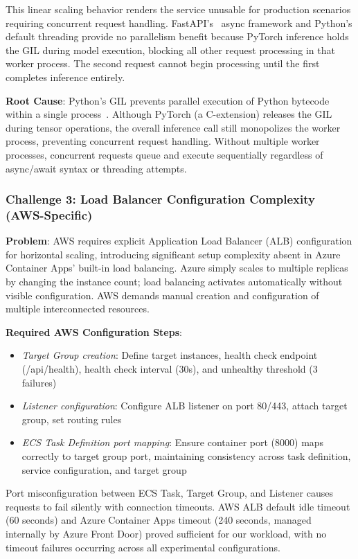 This linear scaling behavior renders the service unusable for production scenarios requiring concurrent request handling. FastAPI's~\cite{fastapi2024} async framework and Python's default threading provide no parallelism benefit because PyTorch inference holds the GIL during model execution, blocking all other request processing in that worker process. The second request cannot begin processing until the first completes inference entirely.

\textbf{Root Cause}: Python's GIL prevents parallel execution of Python bytecode within a single process~\cite{python2023gil}. Although PyTorch (a C-extension) releases the GIL during tensor operations, the overall inference call still monopolizes the worker process, preventing concurrent request handling. Without multiple worker processes, concurrent requests queue and execute sequentially regardless of async/await syntax or threading attempts.

\subsubsection{Challenge 3: Load Balancer Configuration Complexity (AWS-Specific)}

\textbf{Problem}: AWS requires explicit Application Load Balancer (ALB) configuration for horizontal scaling, introducing significant setup complexity absent in Azure Container Apps' built-in load balancing. Azure simply scales to multiple replicas by changing the instance count; load balancing activates automatically without visible configuration. AWS demands manual creation and configuration of multiple interconnected resources.

\textbf{Required AWS Configuration Steps}:
\begin{itemize}
\item \textit{Target Group creation}: Define target instances, health check endpoint (/api/health), health check interval (30s), and unhealthy threshold (3 failures)
\item \textit{Listener configuration}: Configure ALB listener on port 80/443, attach target group, set routing rules
\item \textit{ECS Task Definition port mapping}: Ensure container port (8000) maps correctly to target group port, maintaining consistency across task definition, service configuration, and target group
\end{itemize}

Port misconfiguration between ECS Task, Target Group, and Listener causes requests to fail silently with connection timeouts. AWS ALB default idle timeout (60 seconds) and Azure Container Apps timeout (240 seconds, managed internally by Azure Front Door) proved sufficient for our workload, with no timeout failures occurring across all experimental configurations.

